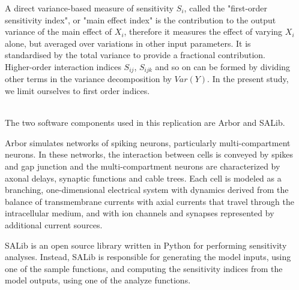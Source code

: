\documentclass{beamer}
\begin{document}
\begin{frame}[t, fragile]
\begin{columns}[onlytextwidth]
\begin{column}{.49\linewidth}
      A direct variance-based measure of sensitivity $S_i$, called the "first-order
      sensitivity index", or "main effect index" is the contribution to the output variance of the main effect of $X_i$,
      therefore it measures the effect of varying $X_i$ alone, but averaged over
      variations in other input parameters. It is standardised by the total variance
      to provide a fractional contribution. Higher-order interaction indices $S_{ij}$,
      $S_{ijk}$ and so on can be formed by dividing other terms in the variance
      decomposition by $Var(Y)$. In the present study, we limit ourselves to first order
      indices.

      \vspace*{1ex}
      \textbf{}\\
      The two software components used in this replication are Arbor and SALib.

      Arbor \cite{Akar2019} simulates networks of spiking neurons,
      particularly multi-compartment neurons. In these networks, the 
      interaction between cells is conveyed by spikes and gap junction 
      and the multi-compartment neurons are characterized by axonal delays, 
      synaptic functions and cable trees. Each cell is modeled as a 
      branching, one-dimensional electrical system with dynamics derived 
      from the balance of transmembrane currents with axial currents that 
      travel through the intracellular medium, and with ion channels and 
      synapses represented by additional current sources.

      SALib \cite{Tennoe2018} is an open source library written in Python
      for performing sensitivity analyses. Instead, SALib is responsible for generating 
      the model inputs, using one of the sample functions, and computing 
      the sensitivity indices from the model outputs, using one of the 
      analyze functions.

    \end{column}
    \begin{column}{.49\linewidth}

      


\end{column}
\end{columns}
\end{frame}
\end{document}
